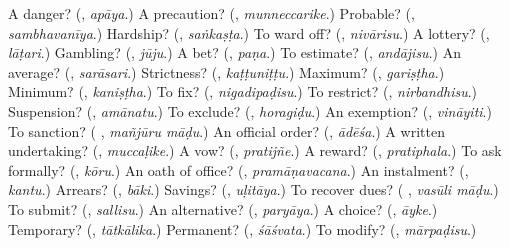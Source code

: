 \begin{tcolorbox}[breakable,colback=teal!4,colframe=teal!35!black,title={Before you move on}]
A danger? (\textbf{}, \emph{apāya}.) A precaution? (\textbf{}, \emph{munneccarike}.) Probable? (\textbf{}, \emph{sambhavanīya}.) Hardship? (\textbf{}, \emph{saṅkaṣṭa}.) To ward off? (\textbf{}, \emph{nivārisu}.) A lottery? (\textbf{}, \emph{lāṭari}.) Gambling? (\textbf{}, \emph{jūju}.) A bet? (\textbf{}, \emph{paṇa}.) To estimate? (\textbf{}, \emph{andājisu}.) An average? (\textbf{}, \emph{sarāsari}.) Strictness? (\textbf{}, \emph{kaṭṭuniṭṭu}.) Maximum? (\textbf{}, \emph{gariṣṭha}.) Minimum? (\textbf{}, \emph{kaniṣṭha}.) To fix? (\textbf{}, \emph{nigadipaḍisu}.) To restrict? (\textbf{}, \emph{nirbandhisu}.) Suspension? (\textbf{}, \emph{amānatu}.) To exclude? (\textbf{}, \emph{horagiḍu}.) An exemption? (\textbf{}, \emph{vināyiti}.) To sanction? (\textbf{ }, \emph{mañjūru māḍu}.) An official order? (\textbf{}, \emph{ādēśa}.) A written undertaking? (\textbf{}, \emph{muccaḷike}.) A vow? (\textbf{}, \emph{pratijñe}.) A reward? (\textbf{}, \emph{pratiphala}.) To ask formally? (\textbf{}, \emph{kōru}.) An oath of office? (\textbf{}, \emph{pramāṇavacana}.) An instalment? (\textbf{}, \emph{kantu}.) Arrears? (\textbf{}, \emph{bāki}.) Savings? (\textbf{}, \emph{uḷitāya}.) To recover dues? (\textbf{ }, \emph{vasūli māḍu}.) To submit? (\textbf{}, \emph{sallisu}.) An alternative? (\textbf{}, \emph{paryāya}.) A choice? (\textbf{}, \emph{āyke}.) Temporary? (\textbf{}, \emph{tātkālika}.) Permanent? (\textbf{}, \emph{śāśvata}.) To modify? (\textbf{}, \emph{mārpaḍisu}.)
\end{tcolorbox}
